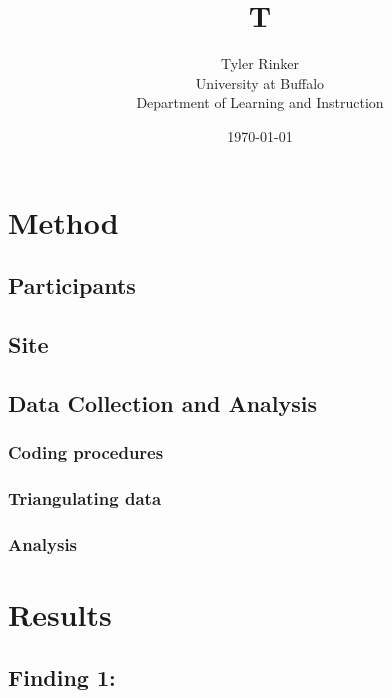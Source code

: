



\title{T}
\author{Tyler Rinker\\University at Buffalo\\Department of Learning and Instruction}
\date{\today} 
\maketitle

\section{Method}
\subsection{Participants}
\subsection{Site}
\subsection{Data Collection and Analysis}
\subsubsection{Coding procedures}
\subsubsection{Triangulating data}
\subsubsection{Analysis}

\section{Results}
\subsection{Finding 1:}
